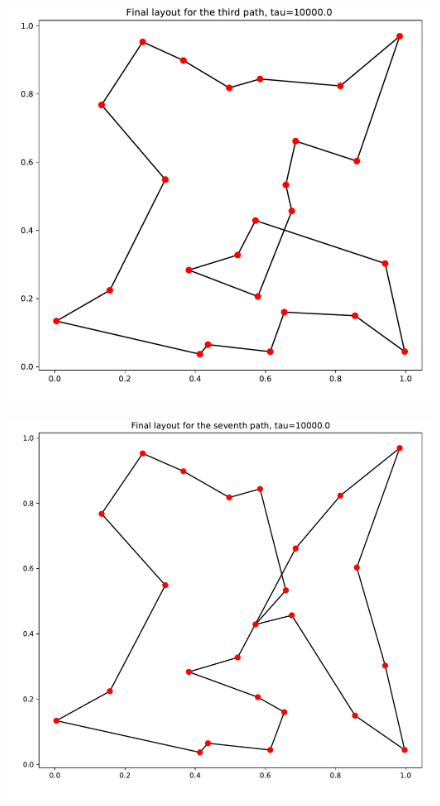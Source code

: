 \documentclass{article}
\begin{document}
 \begin{figure}[H]
     \centerline{\includegraphics[scale=0.6]{images/Q1a_path3_tau10000.pdf}}
     \label{fig:1a_path3_tau10000}
 \end{figure}
 \begin{figure}[H]
     \centerline{\includegraphics[scale=0.6]{images/Q1a_path7_tau10000.pdf}}
     \label{fig:1a_path7_tau10000}
 \end{figure}
\end{document}

